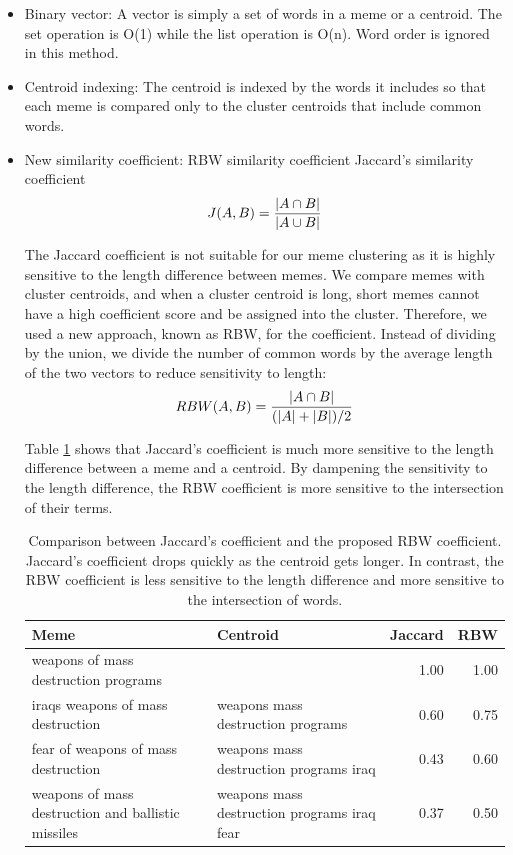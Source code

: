 \documentclass{sig-alternate}
\begin{document}
\begin{itemize}
 \item Binary vector: A vector is simply a set of words in a meme or a centroid. The set operation is O(1) while the list operation is O(n). Word order is ignored in this method.
 \item Centroid indexing: The centroid is indexed by the words it includes so that each meme is compared only to the cluster centroids that include common words.
 \item New similarity coefficient: RBW similarity coefficient
 Jaccard's similarity coefficient 
\begin{displaymath} 
 J(A,B) = {{|A \cap B|}\over{|A \cup B|}}
\end{displaymath} 

The Jaccard coefficient is not suitable for our meme clustering as it is highly sensitive to the length difference between memes. We compare memes with cluster centroids, and when a cluster centroid is long, short memes cannot have a high coefficient score and be assigned into the cluster. Therefore, we used a new approach, known as RBW, for the coefficient. Instead of dividing by the union, we divide the number of common words by the average length of the two vectors to reduce sensitivity to length:\\

\begin{displaymath}
RBW(A, B) = {{|A \cap B|} \over {(|A|+|B|) / 2} }
\end{displaymath}

Table \ref{table:sim} shows that Jaccard's coefficient is much more sensitive to the length difference between a meme and a centroid. By dampening the sensitivity to the length difference, the RBW coefficient is more sensitive to the intersection of their terms. 

\begin{table}[h!t!]
\begin{center}
\begin{tabular}{p{3.0cm}|p{2.2cm}|r|r}
\hline
\textbf{Meme}&\textbf{Centroid}&\textbf{Jaccard}&\textbf{RBW}\\
\hline
weapons of mass destruction programs&&1.00&1.00\\
\hline
iraqs weapons of mass destruction & weapons mass destruction programs&0.60&0.75\\
\hline
fear of weapons of mass destruction & weapons mass destruction programs iraq&0.43&0.60\\
\hline
weapons of mass destruction and ballistic missiles&weapons mass destruction programs iraq fear&0.37&0.50\\
\hline
\end{tabular}
\caption{Comparison between Jaccard's coefficient and the proposed RBW coefficient. Jaccard's coefficient drops quickly as the centroid gets longer. In contrast, the RBW coefficient is less sensitive to the length difference and more sensitive to the intersection of words.}
\label{table:sim}
\end{center}
\end{table}


\end{itemize}
\end{document}
